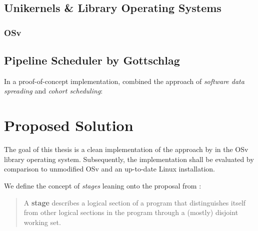 \documentclass{article}
\begin{document}
\subsection{Unikernels \& Library Operating Systems}
\subsubsection{OSv}

\subsection{Pipeline Scheduler by Gottschlag}

In a proof-of-concept implementation, \citeauthor{gottschlag2017} combined the approach of \textit{software data spreading} and \textit{cohort scheduling}:

\section{Proposed Solution}\label{propsolution}

The goal of this thesis is a clean implementation of the approach by \citeauthor{gottschlag2017} in the OSv library operating system.
Subsequently, the implementation shall be evaluated by comparison to unmodified OSv and an up-to-date Linux installation.

We define the concept of \textit{stages} leaning onto the proposal from \cite{cohort}:
\begin{quote}
A \textbf{stage} describes a logical section of a program that distinguishes itself from other logical sections in the program
through a (mostly) disjoint working set.
\end{quote}
\end{document}
